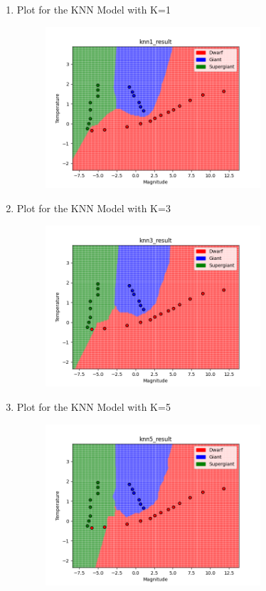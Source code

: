 \documentclass[submit]{harvardml}
\begin{document}
\begin{enumerate}
\begin{enumerate}
\begin{figure}[H]
            \centering
        \end{figure}
        \item Plot for the KNN Model with K=1
        \begin{figure}[H]
            \includegraphics[width=8cm]{hw2/P3_plots/knn1_result.png}
            \centering
        \end{figure}
        \item Plot for the KNN Model with K=3
        \begin{figure}[H]
            \includegraphics[width=8cm]{hw2/P3_plots/knn3_result.png}
            \centering
        \end{figure}
        \item Plot for the KNN Model with K=5
        \begin{figure}[H]
            \includegraphics[width=8cm]{hw2/P3_plots/knn5_result.png}

\end{figure}
\end{enumerate}
\end{enumerate}
\end{document}
